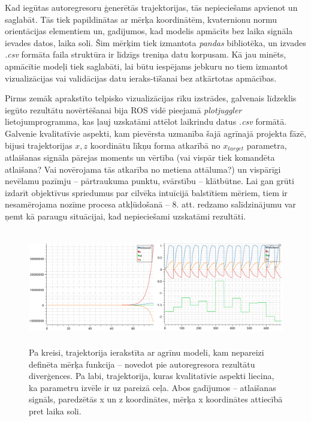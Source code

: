 \documentclass[12pt, a4paper]{article}
\numberwithin{equation}{section} %
\begin{document}
Kad iegūtas autoregresoru ģenerētās trajektorijas, tās nepieciešams apvienot un saglabāt. Tās tiek papildinātas ar mērķa koordinātēm, kvaternionu normu orientācijas elementiem un, gadījumos, kad modelis apmācīts bez laika signāla ievades datos, laika soli.  Šim mērķim tiek izmantota \textit{pandas} bibliotēka, un izvades \textit{.csv} formāta faila struktūra ir līdzīgs treniņa datu korpusam. Kā jau minēts, apmācītie modeļi tiek saglabāti, lai būtu iespējams jebkuru no tiem izmantot vizualizācijas vai validācijas datu ieraks-tīšanai bez atkārtotas apmācības. 

Pirms zemāk aprakstīto telpisko vizualizācijas rīku izstrādes, galvenais līdzeklis iegūto rezultātu novērtēšanai bija ROS vidē pieejamā \textit{plotjuggler} lietojumprogramma, kas ļauj uzskatāmi attēlot laikrindu datus \textit{.csv} formātā. Galvenie kvalitatīvie aspekti, kam pievērsta uzmanība šajā agrīnajā projekta fāzē, bijusi trajektorijas $x, z$ koordinātu līkņu forma atkarībā no $x_{target}$ parametra, atlaišanas signāla pārejas moments un vērtība (vai vispār tiek komandēta atlaišana? Vai novērojama tās atkarība no metiena attāluma?) un vispārīgi nevēlamu pazīmju -- pārtraukuma punktu, svārstību -- klātbūtne. Lai gan grūti izdarīt objektīvus spriedumus par cilvēka intuīcijā balstītiem mēriem, tiem ir nesamērojama nozīme procesa atkļūdošanā -- 8. att. redzamo salīdzinājumu var ņemt kā paraugu situācijai, kad nepieciešami uzskatāmi rezultāti.

\begin{figure}[t!]
    \centering
    \includegraphics[height=5cm,page=1]{../img/qualitative_plots.png}
    \caption{Pa kreisi, trajektorija ierakstīta ar agrīnu modeli, kam nepareizi definēta mērķa funkcija -- novedot pie autoregresora rezultātu diverģences. Pa labi, trajektorija, kuras kvalitatīvie aspekti liecina, ka parametru izvēle ir uz pareizā ceļa. Abos gadījumos -- atlaišanas signāls, paredzētās x un z koordinātes, mērķa x koordinātes attiecībā pret laika soli.}
\end{figure}
\end{document}
